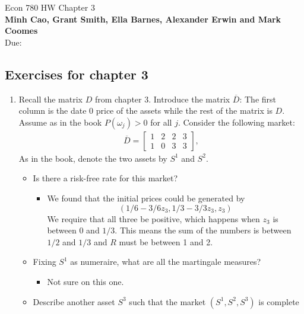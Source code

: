 \documentclass[12pt]{article}
\renewcommand{\o}{\omega}
\newcommand{\ol}{\overline}
\begin{document}
\begin{center}
{\Large Econ 780 \hspace{0.5cm} HW Chapter 3}\\
\textbf{Minh Cao, Grant Smith, Ella Barnes, Alexander Erwin and Mark Coomes}\\ %
Due:  %
\end{center}

\vspace{0.2 cm}


\subsection*{Exercises for chapter 3}


\begin{enumerate}
    \item Recall the matrix $D$ from chapter 3. Introduce the matrix $\ol{D}$: The first column is the date 0 price of the assets while the rest of the matrix is $D$. Assume as in the book $P(\o_j) > 0$ for all $j$. Consider the following market:
    \begin{align*}
    \ol{D}=
    \left[\begin{array}{llll}
    1 & 2 & 2 & 3\\
    1 & 0 & 3 & 3
    \end{array}
    \right],
    \end{align*}
    As in the book, denote the two assets by $S^1$ and $S^2$. 
      \begin{itemize}
        \item Is there a risk-free rate for this market?
        \begin{itemize}
            \item We found that the initial prices could be generated by $$(1/6-3/6 z_3, 1/3 - 3/3 z_3,z_3)$$
            We require that all three be positive, which happens when $z_3$ is between 0 and $1/3$. This means the sum of the numbers is between $1/2$ and $1/3$ and $R$ must be between 1 and 2. 
        \end{itemize}
        \item Fixing $S^1$ as numeraire, what are all the martingale measures?
        \begin{itemize}
            \item Not sure on this one.
        \end{itemize}
        \item Describe another asset $S^3$ such that the market $(S^1, S^2, S^3)$ is complete

\end{itemize}
\end{enumerate}
\end{document}

